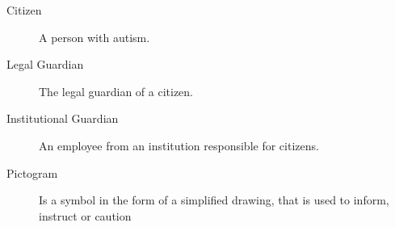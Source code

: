 \begin{description}
\item[Citizen] A person with autism.
\item[Legal Guardian] The legal guardian of a citizen.
\item[Institutional Guardian] An employee from an institution responsible for citizens.
\item[Pictogram] Is a symbol in the form of a simplified drawing, that is used to inform, instruct or caution
\end{description}